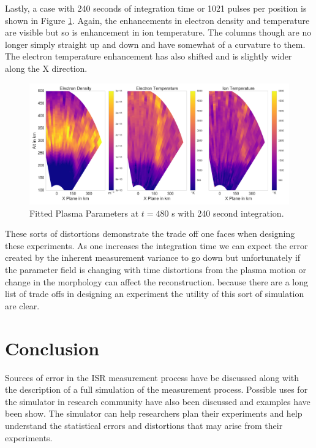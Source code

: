 \documentclass[draft,ras]{agutex}
\begin{document}
\begin{article}
Lastly, a case with 240 seconds of integration time or 1021 pulses per position is shown in Figure \ref{fig:f240plparamst60}. Again, the enhancements in electron density and temperature are visible but so is enhancement in ion temperature. The columns though are no longer simply straight up and down and have somewhat of a curvature to them. The electron temperature enhancement has also shifted and is slightly wider along the X direction. 

\begin{figure}[!t]
\centering
\includegraphics[width=5in]{0480_240_int}
\caption{Fitted Plasma Parameters at $t=480$ s with 240 second integration.}
\label{fig:f240plparamst60}
\end{figure}

These sorts of distortions demonstrate the trade off one faces when designing these experiments. As one increases the integration time we can expect the error created by the inherent measurement variance to go down but unfortunately if the parameter field is changing with time distortions from the plasma motion or change in the morphology can affect the reconstruction. because there are a long list of trade offs in designing an experiment the utility of this sort of simulation are clear. 
\section{Conclusion}
Sources of error in the ISR measurement process have be discussed along with the description of a full simulation of the measurement process. Possible uses for the simulator in research community have also been discussed and examples have been show. The simulator can help researchers plan their experiments and help understand the statistical errors and distortions that may arise from their experiments. 


\end{article}
\end{document}

